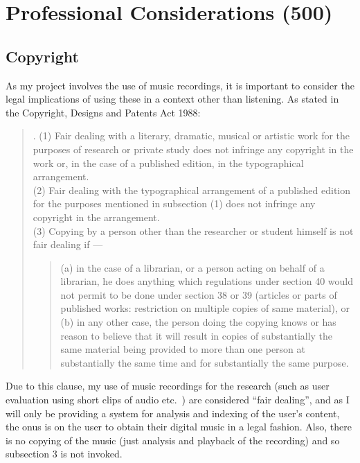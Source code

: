 \section{Professional Considerations (500)}

\subsection{Copyright}
As my project involves the use of music recordings, it is important to consider the legal implications of using these in a context other than listening. As stated in the Copyright, Designs and Patents Act 1988:
\begin{quotation}. (1) Fair dealing with a literary, dramatic, musical or artistic
work for the purposes of research or private study does not infringe
any copyright in the work or, in the case of a published edition, in
the typographical arrangement.\\
(2) Fair dealing with the typographical arrangement of a published
edition for the purposes mentioned in subsection (1) does not infringe
any copyright in the arrangement.\\
(3) Copying by a person other than the researcher or student himself
is not fair dealing if ---
\begin{quotation}\noindent
(a) in the case of a librarian, or a person acting on behalf of a
librarian, he does anything which regulations under section 40 would
not permit to be done under section 38 or 39 (articles or parts of
published works: restriction on multiple copies of same material), or\\
(b) in any other case, the person doing the copying knows or has
reason to believe that it will result in copies of substantially the same
material being provided to more than one person at substantially the
same time and for substantially the same purpose.
\end{quotation}
\end{quotation}
Due to this clause, my use of music recordings for the research (such as user
evaluation using short clips of audio etc.\ ) are considered ``fair dealing'', and as I
will only be providing a system for analysis and indexing of the user's content,
the onus is on the user to obtain their digital music in a legal fashion. Also, there is no copying of the music (just analysis and playback of the recording)
and so subsection 3 is not invoked.

